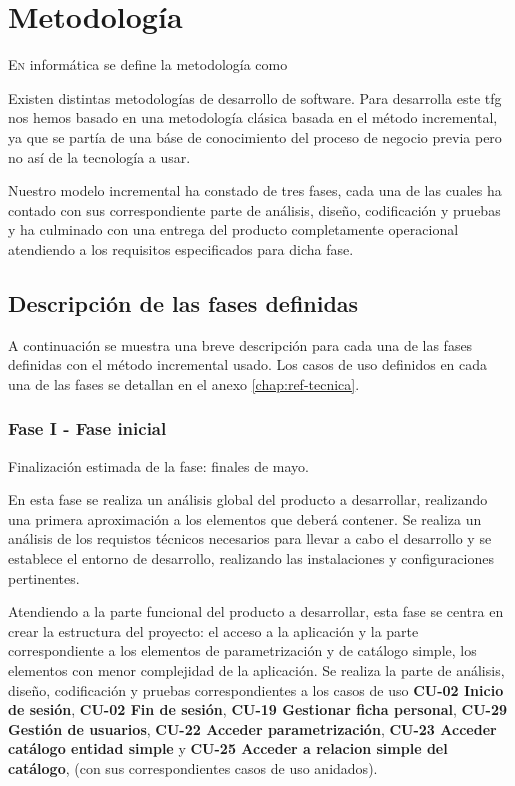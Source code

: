 \chapter{Metodología}
\label{chap:metodologia}

\lettrine{E} {n} informática se define la metodología como 

Existen distintas metodologías de desarrollo de software. Para desarrolla este \acrshort{tfg} nos hemos basado en una metodología clásica basada en el método incremental, ya que se partía de una báse de conocimiento del proceso de negocio previa pero no así de la tecnología a usar.

Nuestro modelo incremental ha constado de tres fases, cada una de las cuales ha contado con sus correspondiente parte de análisis, diseño, codificación y pruebas y ha culminado con una entrega del producto completamente operacional atendiendo a los requisitos especificados para dicha fase.

\section{Descripción de las fases definidas}
\label{sec:metodologia-fases}

A continuación se muestra una breve descripción para cada una de las fases definidas con el método incremental usado. Los casos de uso definidos en cada una de las fases se detallan en el anexo \ref{chap:ref-tecnica}.

\subsection{Fase I - Fase inicial}
Finalización estimada de la fase: finales de mayo.

En esta fase se realiza un análisis global del producto a desarrollar, realizando una primera aproximación a los elementos que deberá contener.
Se realiza un análisis de los requistos técnicos necesarios para llevar a cabo el desarrollo y se establece el entorno de desarrollo, realizando las instalaciones y configuraciones pertinentes. 

Atendiendo a la parte funcional del producto a desarrollar, esta fase se centra en crear la estructura del proyecto: el acceso a la aplicación y la parte correspondiente a los elementos de parametrización y de catálogo simple, los elementos con menor complejidad de la aplicación. Se realiza la parte de análisis, diseño, codificación y pruebas correspondientes a los casos de uso \textbf{CU-02 Inicio de sesión}, \textbf{CU-02 Fin de sesión}, \textbf{CU-19 Gestionar ficha personal}, \textbf{CU-29 Gestión de usuarios}, \textbf{CU-22 Acceder parametrización}, \textbf{CU-23 Acceder catálogo entidad simple} y \textbf{CU-25 Acceder a relacion simple del catálogo}, (con sus correspondientes casos de uso anidados). 


